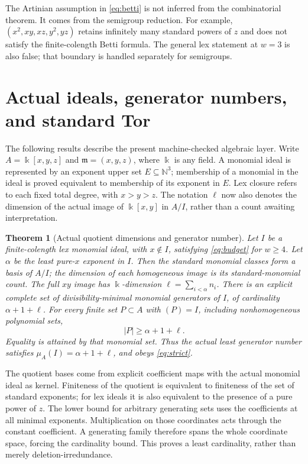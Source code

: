\documentclass[11pt,a4paper]{article}
\newtheorem{theorem}{Theorem}[section]
\newcommand{\NN}{\mathbb N}
\newcommand{\kk}{\Bbbk}
\begin{document}
The Artinian assumption in \eqref{eq:betti} is not inferred from the combinatorial theorem. It comes from the semigroup reduction. For example, $(x^2,xy,xz,y^2,yz)$ retains infinitely many standard powers of $z$ and does not satisfy the finite-colength Betti formula. The general lex statement at $w=3$ is also false; that boundary is handled separately for semigroups.


\section{Actual ideals, generator numbers, and standard Tor}\label{sec:actual}
The following results describe the present machine-checked algebraic layer.
Write $A=\kk[x,y,z]$ and $\mathfrak m=(x,y,z)$, where $\kk$ is any field.
A monomial ideal is represented by an exponent upper set $E\subseteq\NN^3$;
membership of a monomial in the ideal is proved equivalent to membership of its
exponent in $E$. Lex closure refers to each fixed total degree, with $x>y>z$.
The notation $\ell$ now also denotes the dimension of the actual image of
$\kk[x,y]$ in $A/I$, rather than a count awaiting interpretation.

\begin{theorem}[Actual quotient dimensions and generator number]\label{thm:actual}
Let $I$ be a finite-colength lex monomial ideal, with $x\notin I$, satisfying
\eqref{eq:budget} for $w\ge4$. Let $\alpha$ be the least pure-$x$ exponent in $I$.
Then the standard monomial classes form a basis of $A/I$; the dimension of each
homogeneous image is its standard-monomial count. The full $xy$ image has
$\kk$-dimension $\ell=\sum_{i<\alpha}n_i$.
There is an explicit complete set of divisibility-minimal monomial generators
of $I$, of cardinality $\alpha+1+\ell$. For every finite set $P\subset A$ with
$(P)=I$, including nonhomogeneous polynomial sets,
\[
 |P|\ge\alpha+1+\ell.
\]
Equality is attained by that monomial set. Thus the actual least generator
number satisfies $\mu_A(I)=\alpha+1+\ell$, and obeys \eqref{eq:strict}.
\end{theorem}

The quotient bases come from explicit coefficient maps with the actual
monomial ideal as kernel. Finiteness of the quotient is equivalent to finiteness
of the set of standard exponents; for lex ideals it is also equivalent to the
presence of a pure power of $z$. The lower bound for arbitrary generating sets
uses the coefficients at all minimal exponents. Multiplication on those
coordinates acts through the constant coefficient. A generating family
therefore spans the whole coordinate space, forcing the cardinality bound.
This proves a least cardinality, rather than merely deletion-irredundance.
\end{document}
